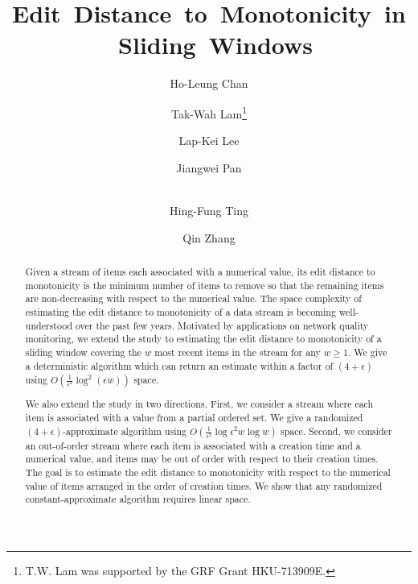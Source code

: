 \documentclass{llncs}
\newcommand{\eps}{\epsilon}
\begin{document}
\title{
  \mbox{Edit Distance to Monotonicity in Sliding Windows}
}


\author{Ho-Leung Chan
\and Tak-Wah Lam\thanks{T.W. Lam was supported by the GRF Grant HKU-713909E.}
\and Lap-Kei Lee
\and Jiangwei Pan
\and \\
Hing-Fung Ting
\and Qin Zhang
}




\vspace{-.3in}
\maketitle

\vspace{-.2in}
\begin{abstract}
Given a stream of items each associated with a numerical value,
its edit distance to monotonicity is the minimum number of items
to remove so that the remaining items are non-decreasing with respect
to the numerical value. The space complexity of estimating the
edit distance to monotonicity of a data stream is becoming well-understood
over the past few years.
Motivated by applications on network quality monitoring,
we extend the study to estimating the edit distance to monotonicity of
a sliding window covering the $w$ most recent items in the stream for any $w \ge 1$.
We give a deterministic algorithm which can return an estimate within a factor of
$(4+\eps)$ using $O(\frac{1}{\eps^2} \log^2(\eps w))$ space.

We also extend the study in two directions.
First, we consider a stream where
each item is associated with a value from a partial ordered set.
We give a randomized $(4+\epsilon)$-approximate algorithm
using $O(\frac{1}{\epsilon^2} \log \epsilon^2 w \log w)$ space.
Second, we consider an out-of-order stream where each item
is associated with a creation time and a numerical value,
and items may be out of order with respect to their creation times.
The goal is to estimate the edit distance to monotonicity
with respect to the numerical value of items
arranged in the order of creation times.
We show that any randomized constant-approximate algorithm
requires linear space.
\end{abstract}
\end{document}
